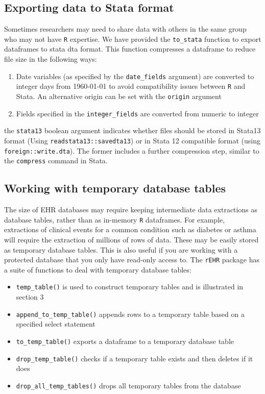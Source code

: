 \documentclass[]{article}
\begin{document}
\subsection{Exporting data to Stata
format}\label{exporting-data-to-stata-format}

Sometimes researchers may need to share data with others in the same
group who may not have \texttt{R} expertise. We have provided the
\texttt{to\_stata} function to export dataframes to stata dta format.
This function compresses a dataframe to reduce file size in the
following ways:

\begin{enumerate}
\def\labelenumi{\arabic{enumi}.}
\itemsep1pt\parskip0pt
\item
  Date variables (as specified by the \texttt{date\_fields} argument)
  are converted to integer days from 1960-01-01 to avoid compatibility
  issues between \texttt{R} and Stata. An alternative origin can be set
  with the \texttt{origin} argument
\item
  Fields specified in the \texttt{integer\_fields} are converted from
  numeric to integer
\end{enumerate}

the \texttt{stata13} boolean argument indicates whether files should be
stored in Stata13 format (Using \texttt{readstata13::savedta13}) or in
Stata 12 compatible format (using \texttt{foreign::write.dta}). The
former includes a further compression step, similar to the
\texttt{compress} command in Stata.

\subsection{Working with temporary database
tables}\label{working-with-temporary-database-tables}

The size of EHR databases may require keeping intermediate data
extractions as database tables, rather than as in-memory \texttt{R}
dataframes. For example, extractions of clinical events for a common
condition such as diabetes or asthma will require the extraction of
millions of rows of data. These may be easily stored as temporary
database tables. This is also useful if you are working with a protected
database that you only have read-only access to. The \texttt{rEHR}
package has a suite of functions to deal with temporary database tables:

\begin{itemize}
\itemsep1pt\parskip0pt
\item
  \texttt{temp\_table()} is used to construct temporary tables and is
  illustrated in section 3
\item
  \texttt{append\_to\_temp\_table()} appends rows to a temporary table
  based on a specified select statement
\item
  \texttt{to\_temp\_table()} exports a dataframe to a temporary database
  table
\item
  \texttt{drop\_temp\_table()} checks if a temporary table exists and
  then deletes if it does
\item
  \texttt{drop\_all\_temp\_tables()} drops all temporary tables from the
  database
\end{itemize}
\end{document}
